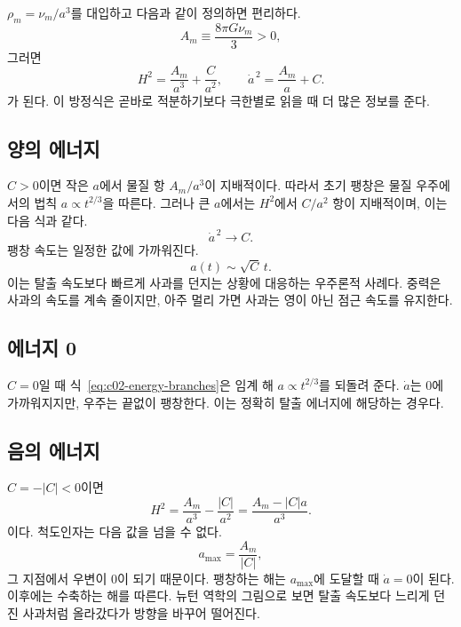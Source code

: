 \(\rho_m=\nu_m/a^3\)를 대입하고 다음과 같이 정의하면 편리하다.
\begin{equation}
A_m\equiv\frac{8\pi G\nu_m}{3}>0,
\end{equation}
그러면
\begin{equation}
H^2=\frac{A_m}{a^3}+\frac{C}{a^2},
\qquad
\dot a^{\,2}=\frac{A_m}{a}+C.
\label{eq:c02-energy-branches}
\end{equation}
가 된다. 이 방정식은 곧바로 적분하기보다 극한별로 읽을 때 더 많은 정보를 준다.

\subsection{양의 에너지}

\(C>0\)이면 작은 \(a\)에서 물질 항 \(A_m/a^3\)이 지배적이다. 따라서 초기 팽창은 물질 우주에서의 법칙 \(a\propto t^{2/3}\)을 따른다. 그러나 큰 \(a\)에서는 \(H^2\)에서 \(C/a^2\) 항이 지배적이며, 이는 다음 식과 같다.
\begin{equation}
\dot a^{\,2}\longrightarrow C.
\end{equation}
팽창 속도는 일정한 값에 가까워진다.
\begin{equation}
a(t)\sim\sqrt C\,t.
\label{eq:c02-positive-late}
\end{equation}
이는 탈출 속도보다 빠르게 사과를 던지는 상황에 대응하는 우주론적 사례다. 중력은 사과의 속도를 계속 줄이지만, 아주 멀리 가면 사과는 영이 아닌 점근 속도를 유지한다.

\subsection{에너지 0}

\(C=0\)일 때 식~\eqref{eq:c02-energy-branches}은 임계 해 \(a\propto t^{2/3}\)를 되돌려 준다. \(\dot a\)는 0에 가까워지지만, 우주는 끝없이 팽창한다. 이는 정확히 탈출 에너지에 해당하는 경우다.

\subsection{음의 에너지}

\(C=-|C|<0\)이면
\begin{equation}
H^2=\frac{A_m}{a^3}-\frac{|C|}{a^2}
=\frac{A_m-|C|a}{a^3}.
\label{eq:c02-negative-energy}
\end{equation}
이다. 척도인자는 다음 값을 넘을 수 없다.
\begin{equation}
a_{\max}=\frac{A_m}{|C|},
\label{eq:c02-amax}
\end{equation}
그 지점에서 우변이 0이 되기 때문이다. 팽창하는 해는 \(a_{\max}\)에 도달할 때 \(\dot a=0\)이 된다. 이후에는 수축하는 해를 따른다. 뉴턴 역학의 그림으로 보면 탈출 속도보다 느리게 던진 사과처럼 올라갔다가 방향을 바꾸어 떨어진다.

